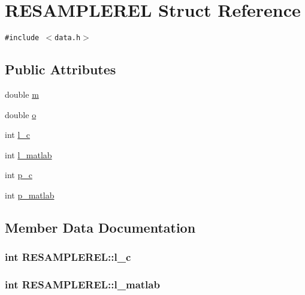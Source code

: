\hypertarget{struct_r_e_s_a_m_p_l_e_r_e_l}{
\section{RESAMPLEREL Struct Reference}
\label{struct_r_e_s_a_m_p_l_e_r_e_l}
}
{\tt \#include $<$data.h$>$}

\subsection*{Public Attributes}
\begin{CompactItemize}
\item 
double \hyperlink{struct_r_e_s_a_m_p_l_e_r_e_l_e79ba9ecbed03cad26e60975bbf1e5e8}{m}
\item 
double \hyperlink{struct_r_e_s_a_m_p_l_e_r_e_l_8dede6d5ed8f2366265324e7a1a167c3}{o}
\item 
int \hyperlink{struct_r_e_s_a_m_p_l_e_r_e_l_c499afc698b8f95725020310faa34596}{l\_\-c}
\item 
int \hyperlink{struct_r_e_s_a_m_p_l_e_r_e_l_07f0de99369e06b81e0fa03a63f12099}{l\_\-matlab}
\item 
int \hyperlink{struct_r_e_s_a_m_p_l_e_r_e_l_3e7691b7e3a7ecca2c7c1b2c492aae74}{p\_\-c}
\item 
int \hyperlink{struct_r_e_s_a_m_p_l_e_r_e_l_471ee590f554002023996f1e76d6e696}{p\_\-matlab}
\end{CompactItemize}


\subsection{Member Data Documentation}
\hypertarget{struct_r_e_s_a_m_p_l_e_r_e_l_c499afc698b8f95725020310faa34596}{
\subsubsection[{l\_\-c}]{\setlength{\rightskip}{0pt plus 5cm}int {\bf RESAMPLEREL::l\_\-c}}}
\label{struct_r_e_s_a_m_p_l_e_r_e_l_c499afc698b8f95725020310faa34596}


\hypertarget{struct_r_e_s_a_m_p_l_e_r_e_l_07f0de99369e06b81e0fa03a63f12099}{
\subsubsection[{l\_\-matlab}]{\setlength{\rightskip}{0pt plus 5cm}int {\bf RESAMPLEREL::l\_\-matlab}}}
\label{struct_r_e_s_a_m_p_l_e_r_e_l_07f0de99369e06b81e0fa03a63f12099}


